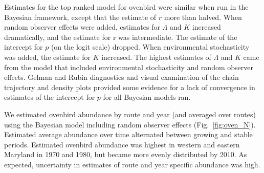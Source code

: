 \documentclass[12pt]{article}
\begin{document}
Estimates for the top ranked model for ovenbird
were similar when
run in the Bayesian framework, except that the estimate of $r$
more than halved.
When random observer effects
were added, estimates for $\Lambda$ and $K$ increased dramatically,
and the estimate for r was intermediate. The %
estimate of the intercept for $p$ (on the logit scale) dropped. %
When environmental stochasticity was added, the estimate for $K$ increased. %
The highest estimates of $\Lambda$ and $K$ came 
from the model that included environmental stochasticity and random observer effects. %
Gelman and Rubin diagnostics and visual examination of the chain trajectory and density plots
provided some evidence for a lack of convergence in estimates of the
intercept for $p$ for all Bayesian models ran.  

We estimated ovenbird abundance by route and year (and averaged over routes) 
using the Bayesian model including random observer effects (Fig.~\ref{fig:oven_N}).  
Estimated average abundance over time alternated between growing and stable periods.  
Estimated ovenbird
abundance was highest in western and eastern Maryland in 1970 and 1980, but became
more evenly distributed by 2010.  
As expected, uncertainty in estimates of route and year specific abundance was high.
\end{document}
